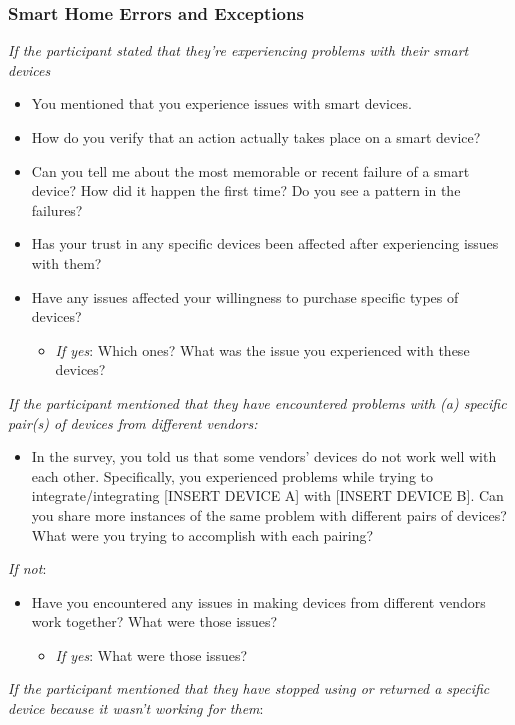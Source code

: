 \subsubsection{Smart Home Errors and Exceptions}

\textit{If the participant stated that they're experiencing problems with their smart devices}
\begin{itemize}
    \item You mentioned that you experience issues with smart devices.
    \item How do you verify that an action actually takes place on a smart device?
    \item Can you tell me about the most memorable or recent failure of a smart device? How did it happen the first time? Do you see a pattern in the failures?
    \item Has your trust in any specific devices been affected after experiencing issues with them?
    \item Have any issues affected your willingness to purchase specific types of devices?
    \begin{itemize}
        \item \textit{If yes}: Which ones? What was the issue you experienced with these devices?
    \end{itemize}
\end{itemize}
\textit{If the participant mentioned that they have encountered problems with (a) specific pair(s) of devices from different vendors:}
\begin{itemize}
    \item In the survey, you told us that some vendors' devices do not work well with each other. Specifically, you experienced problems while trying to integrate/integrating [INSERT DEVICE A] with [INSERT DEVICE B]. Can you share more instances of the same problem with different pairs of devices? What were you trying to accomplish with each pairing?
\end{itemize}
\textit{If not}:
\begin{itemize}
    \item Have you encountered any issues in making devices from different vendors work together? What were those issues?
    \begin{itemize}
        \item \textit{If yes}: What were those issues?
    \end{itemize}
\end{itemize}
\textit{If the participant mentioned that they have stopped using or returned a specific device because it wasn't working for them}: 
